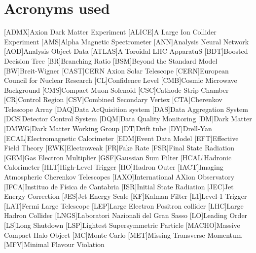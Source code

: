\documentclass[a4paper, 10pt, openright]{report}
\begin{document}
\chapter*{Acronyms used}
\begin{multicols}{2}
\begin{acronym}

[ADMX]{Axion Dark Matter Experiment}
[ALICE]{A Large Ion Collider Experiment}
[AMS]{Alpha Magnetic Spectrometer}
[ANN]{Analysis Neural Network}
[AOD]{Analysis Object Data}
[ATLAS]{A Toroidal LHC ApparatuS}
[BDT]{Boosted Decision Tree}
[BR]{Branching Ratio}
[BSM]{Beyond the Standard Model}
[BW]{Breit-Wigner}
[CAST]{CERN Axion Solar Telescope}
[CERN]{European Council for Nuclear Research}
[CL]{Confidence Level}
[CMB]{Cosmic Microwave Background}
[CMS]{Compact Muon Solenoid}
[CSC]{Cathode Strip Chamber}
[CR]{Control Region}
[CSV]{Combined Secondary Vertex}
[CTA]{Cherenkov Telescope Array}
[DAQ]{Data AcQuisition system}
[DAS]{Data Aggregation System}
[DCS]{Detector Control System}
[DQM]{Data Quality Monitoring}
[DM]{Dark Matter}
[DMWG]{Dark Matter Working Group}
[DT]{Drift tube}
[DY]{Drell-Yan}
[ECAL]{Electromagnetic Calorimeter}
[EDM]{Event Data Model}
[EFT]{Effective Field Theory}
[EWK]{Electroweak}
[FR]{Fake Rate}
[FSR]{Final State Radiation}
[GEM]{Gas Electron Multiplier}
[GSF]{Gaussian Sum Filter}
[HCAL]{Hadronic Calorimeter}
[HLT]{High-Level Trigger}
[HO]{Hadron Outer}
[IACT]{Imaging Atmospheric Cherenkov Telescopes}
[IAXO]{International AXion Observatory}
[IFCA]{Instituo de F\'{i}sica de Cantabria}
[ISR]{Initial State Radiation}
[JEC]{Jet Energy Correction}
[JES]{Jet Energy Scale}
[KF]{Kalman Filter}
[L1]{Level-1 Trigger}
[LAT]{Fermi Large Telescope}
[LEP]{Large Electron Positron collider}
[LHC]{Large Hadron Collider}
[LNGS]{Laboratori Nazionali del Gran Sasso}
[LO]{Leading Order}
[LS]{Long Shutdown}
[LSP]{Lightest Supersymmetric Particle}
[MACHO]{Massive Compact Halo Object}
[MC]{Monte Carlo}
[MET]{Missing Transverse Momentum}
[MFV]{Minimal Flavour Violation}

\end{acronym}
\end{multicols}
\end{document}
